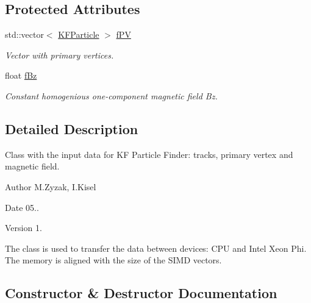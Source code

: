 \subsection*{Protected Attributes}
\begin{DoxyCompactItemize}
\item 
std\+::vector$<$ \hyperlink{classKFParticle}{K\+F\+Particle} $>$ \hyperlink{classKFPInputData_a96a819e69a8c87e304f70ed37633b7af}{f\+PV}\hypertarget{classKFPInputData_a96a819e69a8c87e304f70ed37633b7af}{}\label{classKFPInputData_a96a819e69a8c87e304f70ed37633b7af}

\begin{DoxyCompactList}\small\item\em Vector with primary vertices. \end{DoxyCompactList}\item 
float \hyperlink{classKFPInputData_acae765edc35bef9b0a45000ee9500744}{f\+Bz}\hypertarget{classKFPInputData_acae765edc35bef9b0a45000ee9500744}{}\label{classKFPInputData_acae765edc35bef9b0a45000ee9500744}

\begin{DoxyCompactList}\small\item\em Constant homogenious one-\/component magnetic field Bz. \end{DoxyCompactList}\end{DoxyCompactItemize}


\subsection{Detailed Description}
Class with the input data for KF Particle Finder\+: tracks, primary vertex and magnetic field. 

\begin{DoxyAuthor}{Author}
M.\+Zyzak, I.\+Kisel 
\end{DoxyAuthor}
\begin{DoxyDate}{Date}
05.. 
\end{DoxyDate}
\begin{DoxyVersion}{Version}
1.
\end{DoxyVersion}
The class is used to transfer the data between devices\+: C\+PU and Intel Xeon Phi. The memory is aligned with the size of the S\+I\+MD vectors. 

\subsection{Constructor \& Destructor Documentation}
